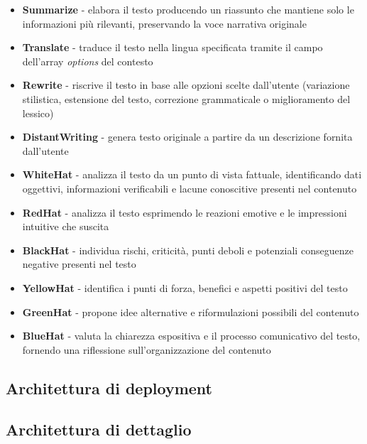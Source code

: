 \documentclass[a4paper,10pt]{article}
\begin{document}
\begin{itemize}
    \item \textbf{Summarize} - elabora il testo producendo un riassunto che mantiene solo le informazioni più rilevanti, preservando la voce narrativa originale
    \item \textbf{Translate} - traduce il testo nella lingua specificata tramite il campo dell'array \textit{options} del contesto
    \item \textbf{Rewrite} - riscrive il testo in base alle opzioni scelte dall'utente (variazione stilistica, estensione del testo, correzione grammaticale o miglioramento del lessico)
    \item \textbf{DistantWriting} - genera testo originale a partire da un descrizione fornita dall'utente
    \item \textbf{WhiteHat} - analizza il testo da un punto di vista fattuale, identificando dati oggettivi, informazioni verificabili e lacune conoscitive presenti nel contenuto
    \item \textbf{RedHat} - analizza il testo esprimendo le reazioni emotive e le impressioni intuitive che suscita
    \item \textbf{BlackHat} - individua rischi, criticità, punti deboli e potenziali conseguenze negative presenti nel testo
    \item \textbf{YellowHat} - identifica i punti di forza, benefici e aspetti positivi del testo
    \item \textbf{GreenHat} - propone idee alternative e riformulazioni possibili del contenuto
    \item \textbf{BlueHat} - valuta la chiarezza espositiva e il processo comunicativo del testo, fornendo una riflessione sull'organizzazione del contenuto
\end{itemize}

\subsection{Architettura di deployment}

\subsection{Architettura di dettaglio}

\newpage
\end{document}
